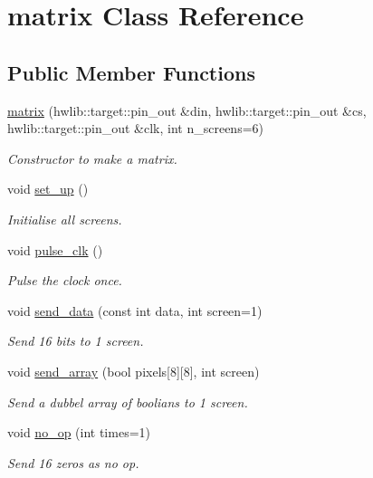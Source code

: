 \hypertarget{classmatrix}{}\section{matrix Class Reference}
\label{classmatrix}
\subsection*{Public Member Functions}
\begin{DoxyCompactItemize}
\item 
\hyperlink{classmatrix_a03241010eb16439dc4cb6a4d9853b7e3}{matrix} (hwlib\+::target\+::pin\+\_\+out \&din, hwlib\+::target\+::pin\+\_\+out \&cs, hwlib\+::target\+::pin\+\_\+out \&clk, int n\+\_\+screens=6)
\begin{DoxyCompactList}\small\item\em Constructor to make a matrix. \end{DoxyCompactList}\item 
void \hyperlink{classmatrix_aa0f47978368c703d5fb2e5cdbdab2337}{set\+\_\+up} ()
\begin{DoxyCompactList}\small\item\em Initialise all screens. \end{DoxyCompactList}\item 
void \hyperlink{classmatrix_a3fa696e5612f375afe4d3d39fd1131ae}{pulse\+\_\+clk} ()
\begin{DoxyCompactList}\small\item\em Pulse the clock once. \end{DoxyCompactList}\item 
void \hyperlink{classmatrix_a58b6def7e8de92f912efd37c329869f0}{send\+\_\+data} (const int data, int screen=1)
\begin{DoxyCompactList}\small\item\em Send 16 bits to 1 screen. \end{DoxyCompactList}\item 
void \hyperlink{classmatrix_a571b55cd680b70d9deb30aa8db10bfb9}{send\+\_\+array} (bool pixels\mbox{[}8\mbox{]}\mbox{[}8\mbox{]}, int screen)
\begin{DoxyCompactList}\small\item\em Send a dubbel array of boolians to 1 screen. \end{DoxyCompactList}\item 
void \hyperlink{classmatrix_aa61545802b99cc45f59940b4c3303a20}{no\+\_\+op} (int times=1)
\begin{DoxyCompactList}\small\item\em Send 16 zero\textquotesingle{}s as no op. \end{DoxyCompactList}\item 

\end{DoxyCompactItemize}

